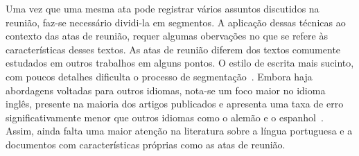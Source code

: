 

Uma vez que uma mesma ata pode registrar vários assuntos discutidos na reunião, faz-se necessário dividi-la em segmentos. A aplicação dessas técnicas ao contexto das atas de reunião, requer algumas obervações no que se refere às características desses textos. As atas de reunião diferem dos textos comumente estudados em outros trabalhos em alguns pontos. O estilo de escrita mais sucinto, com poucos detalhes dificulta o processo de segmentação~\cite{Choi2001-LSA}. Embora haja abordagens voltadas para outros idiomas, nota-se um foco maior no idioma inglês, presente na maioria dos artigos publicados e apresenta uma taxa de erro significativamente menor que outros idiomas como o alemão e o espanhol~\cite{Kern2009,Sitbon2004}. Assim, ainda falta uma maior atenção na literatura sobre a língua portuguesa e a documentos com características próprias como as atas de reunião. %


